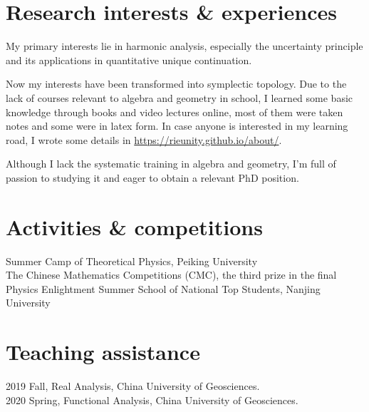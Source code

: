 \documentclass[11pt]{article} %
\begin{document}

\section*{Research interests \& experiences}
My primary interests lie in harmonic analysis, especially the uncertainty principle and its applications in quantitative unique continuation. 

Now my interests have been transformed into symplectic topology. Due to the lack of courses relevant to algebra and geometry in school, I learned some basic knowledge through books and video lectures online, most of them were taken notes and some were in latex form. In case anyone is interested in my learning road, I wrote some details in \url{https://rieunity.github.io/about/}.

Although I lack the systematic training in algebra and geometry, I'm full of passion to studying it and eager to obtain a relevant PhD position.

\section*{Activities \& competitions}
 Summer Camp of Theoretical Physics, Peiking University\\
 The Chinese Mathematics Competitions (CMC), the third prize  in the final\\
 Physics Enlightment Summer School of National Top Students, Nanjing University


\section*{Teaching assistance}
2019 Fall, Real Analysis, China University of Geosciences. \\
2020 Spring, Functional Analysis, China University of Geosciences.
\end{document}
